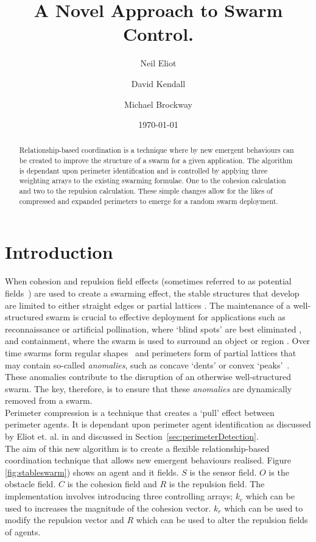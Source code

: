 \documentclass[12pt,a4paper]{IEEEtran}
\title{A Novel Approach to Swarm Control.}
\author[1,*]{Neil Eliot}
\author[ ]{David Kendall}
\author[ ]{Michael Brockway}
\affil[1] {Northumbria University, Faculty of Engineering and Environment, Department of Computer and Information Sciences}
\affil[*] {Corresponding author: Dr Neil Eliot, neil.eliot@northumbria.ac.uk}
\date{\today}
\newcommand{\kc}{\mathit{k_c}}
\newcommand{\kr}{\mathit{k_r}}
\newcommand{\rb}{\mathit{R}}
\begin{document}
\maketitle

\begin{abstract}
Relationship-based coordination is a technique where by new emergent behaviours can be created to improve the structure of a swarm for a given application. The algorithm is dependant upon perimeter identification and is controlled by applying three weighting arrays to the existing swarming formulae. One to the cohesion calculation and two to the repulsion calculation. These simple changes allow for the likes of compressed and expanded perimeters to emerge for a random swarm deployment.
\end{abstract}

\section{Introduction}
When cohesion and repulsion field effects (sometimes referred to as potential fields~\cite{BAF:06,eliot2018metric,VG:05,SW:03,Son2017,liang2019swarm}) are used to create a swarming effect, the stable structures that develop are limited to either straight edges or partial lattices \cite{eliot2017methods}. The maintenance of a well-structured swarm is crucial to effective deployment for applications such as reconnaissance or artificial pollination, where `blind spots' are best eliminated \cite{elamvazhuthi2015optimal}, and containment, where the swarm is used to surround an object or region \cite{cao2012distributed}. Over time swarms form regular shapes~\cite{RAZ:13} and perimeters form of partial lattices that may contain so-called \textit{anomalies}, such as concave `dents' or convex `peaks'~\cite{eliot2019void}. These anomalies contribute to the disruption of an otherwise well-structured swarm. The key, therefore, is to ensure that these \textit{anomalies} are dynamically removed from a swarm.\\
Perimeter compression is a technique that creates a `pull' effect between perimeter agents. It is dependant upon perimeter agent identification as discussed by Eliot et. al. in \cite{eliot2017methods, eliot2018metric, eliot2019void} and discussed in Section~\ref{sec:perimeterDetection}.\\
The aim of this new algorithm is to create a flexible relationship-based coordination technique that allows new emergent behaviours realised. Figure \ref{fig:stableswarm}) shows an agent and it fields. $S$ is the sensor field. $O$ is the obstacle field. $C$ is the cohesion field and $\rb$ is the repulsion field. The implementation involves introducing three controlling arrays; $\kc$ which can be used to increases the magnitude of the cohesion vector. $\kr$ which can be used to modify the repulsion vector and $\rb$ which can be used to alter the repulsion fields of agents.\\
\end{document}
